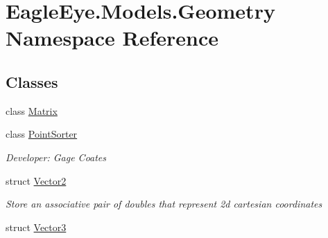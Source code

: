 \hypertarget{namespace_eagle_eye_1_1_models_1_1_geometry}{}\section{Eagle\+Eye.\+Models.\+Geometry Namespace Reference}
\label{namespace_eagle_eye_1_1_models_1_1_geometry}
\subsection*{Classes}
\begin{DoxyCompactItemize}
\item 
class \mbox{\hyperlink{class_eagle_eye_1_1_models_1_1_geometry_1_1_matrix}{Matrix}}
\item 
class \mbox{\hyperlink{class_eagle_eye_1_1_models_1_1_geometry_1_1_point_sorter}{Point\+Sorter}}
\begin{DoxyCompactList}\small\item\em Developer\+: Gage Coates \end{DoxyCompactList}\item 
struct \mbox{\hyperlink{struct_eagle_eye_1_1_models_1_1_geometry_1_1_vector2}{Vector2}}
\begin{DoxyCompactList}\small\item\em Store an associative pair of doubles that represent 2d cartesian coordinates \end{DoxyCompactList}\item 
struct \mbox{\hyperlink{struct_eagle_eye_1_1_models_1_1_geometry_1_1_vector3}{Vector3}}
\end{DoxyCompactItemize}

